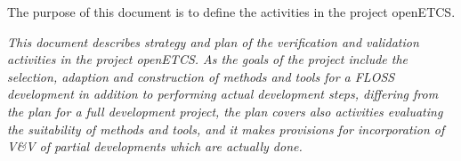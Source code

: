 \documentclass{template/openetcs_report}
\begin{document}
The purpose of this document is to define the \vv activities in the
project openETCS.  

{\it This document describes strategy and plan of the
  verification and validation activities in the project openETCS. As
  the goals of the project include the selection, adaption and
  construction of methods and tools for a FLOSS development in
  addition to performing actual development steps, differing from the
  plan for a full development project, the plan covers also activities
  evaluating the suitability of methods and tools, and it makes
  provisions for incorporation of V\&V of partial developments which
  are actually done.}

\end{document}

